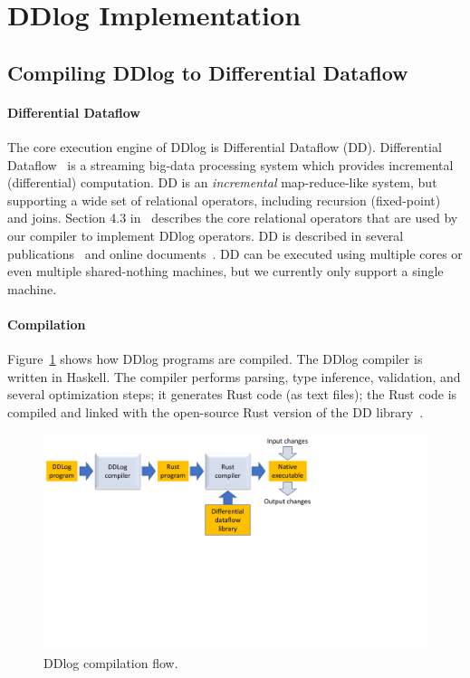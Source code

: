 \section{DDlog Implementation}\label{sec-system}

\subsection{Compiling DDlog to Differential Dataflow}

\paragraph{Differential Dataflow}
The core execution engine of DDlog is Differential Dataflow (DD).
Differential Dataflow~\cite{differential-dataflow-paper} is a
streaming big-data processing system which provides incremental
(differential) computation.  DD is an \emph{incremental}
map-reduce-like system, but supporting a wide set of relational
operators, including recursion (fixed-point) and joins.  Section 4.3
in~\cite{differential-dataflow-paper} describes the core relational
operators that are used by our compiler to implement DDlog operators.
DD is described in several
publications~\cite{timely-dataflow,differential-dataflow-paper} and
online documents~\cite{dd-mdbook,dd-reference}.  DD can be executed
using multiple cores or even multiple shared-nothing machines, but we
currently only support a single machine.

\paragraph{Compilation}
Figure~\ref{fig:compiler-flow} shows how DDlog programs are compiled.
The DDlog compiler is written in Haskell.  The compiler performs
parsing, type inference, validation, and several optimization steps;
it generates Rust code (as text files); the Rust code is compiled and
linked with the open-source Rust version of the DD
library~\cite{differential-dataflow}.

\begin{figure}
\begin{center}
    \includegraphics[width=.7\columnwidth,clip=true,trim=0in 4in 4in
      0in]{compiler-flow.pdf}
\end{center}
    \caption{DDlog compilation flow.\label{fig:compiler-flow}}
\end{figure}

